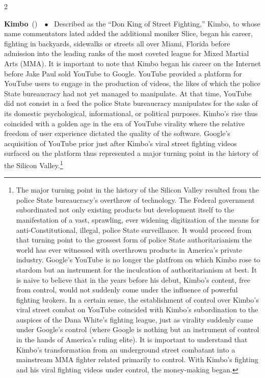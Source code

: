 \documentclass[10pt,a4paper,twoside]{article} %
\newcommand{\entry}[4]{\markboth{#1}{#1}\textbf{#1}\ {(#2)}\ \textit{#3}\ $\bullet$\ {#4}}  %
\begin{document}
\begin{multicols}{2}
\entry{Kimbo} {} {} {
Described as the “Don King of Street Fighting,” Kimbo, to whose name commentators lated added the additional moniker Slice, began his career, fighting in backyards, sidewalks or streets all over Miami, Florida before admission into the leading ranks of the most coveted league for Mixed Martial Arts (MMA).  
\newline \indent It is important to note that Kimbo began his career on the Internet before Jake Paul sold YouTube to Google. YouTube provided a platform for YouTube users to engage in the production of videos, the likes of which the police State bureaucracy had not yet managed to manipulate. At that time, YouTube did not consist in a feed the police State bureaucracy manipulates for the sake of its domestic psychological, informational, or political purposes. Kimbo’s rise thus coincided with a golden age in the era of YouTube virality where the relative freedom of user experience dictated the quality of the software. Google’s acquisition of YouTube prior just after Kimbo’s viral street fighting videos surfaced on the platform thus represented a major turning point in the history of the Silicon Valley.\footnote{The major turning point in the history of the Silicon Valley resulted from the police State bureaucracy’s overthrow of technology. The Federal government subordinated not only existing products but development itself to the manifestation of a vast, sprawling, ever widening digitization of the means for anti-Constitutional, illegal, police State surveillance. It would proceed from that turning point to the grossest form of police State authoritarianism the world has ever witnessed with overthrown products in America’s private industry. Google’s YouTube is no longer the platfrom on which Kimbo rose to stardom but an instrument for the inculcation of authoritarianism at best.
\newline \indent It is naive to believe that in the years before his debut, Kimbo’s content, free from control, would not suddenly come under the influence of powerful fighting brokers. In a certain sense, the establishment of control over Kimbo’s viral street combat on YouTube coincided with Kimbo’s subordination to the auspices of the Dana White’s fighting league, just as virality suddenly came under Google’s control (where Google is nothing but an instrument of control in the hands of America’s ruling elite). It is important to understand that Kimbo’s transformation from an underground street combatant into a mainstream MMA fighter related primarily to control. With Kimbo’s fighting and his viral fighting videos under control, the money-making began. }
}



\end{multicols}
\end{document}
